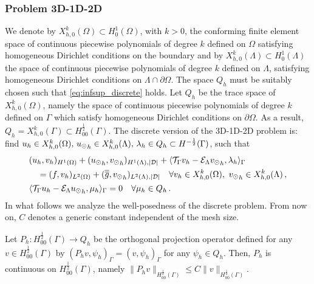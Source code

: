 \documentclass[r]{siamart171218}
\begin{document}
\subsubsection{Problem 3D-1D-2D}
We denote by $X_{h,0}^k(\Omega)\subset H^1_0(\Omega)$, with $k>0$, the conforming finite element space of continuous piecewise polynomials of degree $k$ defined on $\Omega$ satisfying homogeneous Dirichlet conditions on the boundary and by $X_{h,0}^k(\Lambda)\subset H^1_0(\Lambda)$ the space of continuous piecewise polynomials of degree $k$ defined on $\Lambda$, satisfying homogeneous Dirichlet conditions on $\Lambda \cap \partial \Omega$. The space $Q_h$ must be suitably chosen such that \eqref{eq:infsup_discrete} holds. Let $Q_h$ be the trace space of $X_{h,0}^k(\Omega)$, namely the space of continuous piecewise polynomials of degree $k$ defined on $\Gamma$ which satisfy homogeneous Dirichlet conditions on $\partial \Omega$. As a result, $Q_h=X_{h,0}^k(\Gamma) \subset H^\frac12_{00}(\Gamma)$. The discrete version of the 3D-1D-2D problem is:
find $u_h \in X_{h,0}^k (\Omega) ,\, {u_{\odot}}_h \in X_{h,0}^k(\Lambda) ,\, \lambda_h \in Q_h \subset H^{-\frac12}(\Gamma )$, such that
\begin{subequations}
\begin{align}
&(u_h,v_h)_{H^1(\Omega)} + ({u_{\odot}}_h,{v_{\odot}}_h)_{H^1(\Lambda),|\mathcal{D}|}
+ \langle {\mathcal{T}_\Gamma} v_h  - \mathcal{E}_{\Lambda} {v_{\odot}}_h, \lambda_h \rangle_\Gamma
\\
\nonumber
&\quad = (f,v_h)_{L^2(\Omega)} + (\overline{\overline{g}},{v_{\odot}}_h)_{L^2(\Lambda),|\mathcal{D}|} 
\quad \forall v_h \in X_{h,0}^k(\Omega), \ {v_{\odot}}_h \in X_{h,0}^k(\Lambda)\,,
\\
&\langle {\mathcal{T}_\Gamma} u_h - \mathcal{E}_{\Lambda} {u_{\odot}}_h , \mu_h \rangle_\Gamma = 0
\quad \forall \mu_h \in Q_h\,.
\end{align}
\end{subequations}
In what follows we analyze the well-posedness of the discrete problem. 
From now on, $C$ denotes a generic constant independent of the mesh size.

\begin{lemma}\label{lemma:prob1_orthproj}
Let $P_h: H^{\frac 12}_{00}(\Gamma) \rightarrow Q_h$ be the orthogonal projection operator defined  for any $v \in H^{\frac 12}_{00}(\Gamma)$ by
$(P_h v , \psi_h)_\Gamma= (v, \psi_h)_\Gamma$ for any $\psi_h \in Q_h$.
Then, $P_h$ is continuous on $H^{\frac 12}_{00}(\Gamma)$, namely
$\|P_h v\|_{H^{\frac 12}_{00}(\Gamma)} \leq C \|v\|_{H^{\frac 12}_{00}(\Gamma)}$.
\end{lemma}
\end{document}
